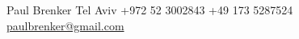 \documentclass{style/modernsimplecv}
\begin{document}
\vfill{} %

\setlength{\parindent}{0pt}
\begin{minipage}[t]{\textwidth}
    \begin{center}\fontfamily{\sfdefault}\selectfont \color{black!70}
        {\small Paul Brenker 
         Tel Aviv 
         +972 52 3002843
         +49 173 5287524
         \protect\url{paulbrenker@gmail.com}
        }
    \end{center}
\end{minipage}
\end{document}

